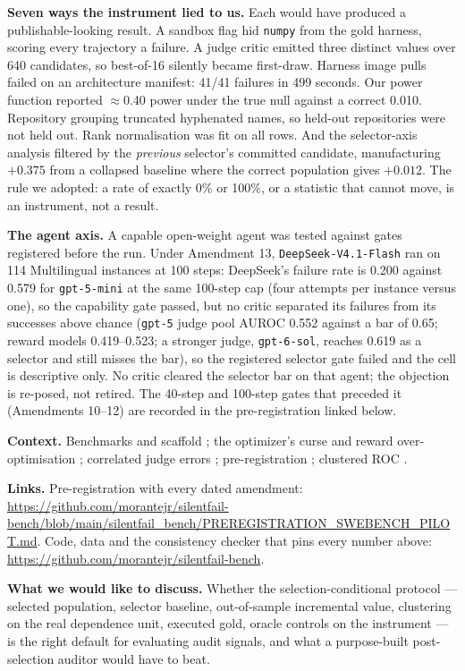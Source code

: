\documentclass[11pt,a4paper]{article}
\begin{document}
\textbf{Seven ways the instrument lied to us.} Each would have produced a publishable-looking result. A sandbox flag hid \texttt{numpy} from the gold harness, scoring every trajectory a failure. A judge critic emitted three distinct values over 640 candidates, so best-of-16 silently became first-draw. Harness image pulls failed on an architecture manifest: 41/41 failures in 499 seconds. Our power function reported $\approx$0.40 power under the true null against a correct 0.010. Repository grouping truncated hyphenated names, so held-out repositories were not held out. Rank normalisation was fit on all rows. And the selector-axis analysis filtered by the \emph{previous} selector's committed candidate, manufacturing $+0.375$ from a collapsed baseline where the correct population gives $+0.012$. The rule we adopted: a rate of exactly 0\% or 100\%, or a statistic that cannot move, is an instrument, not a result.

\textbf{The agent axis.} A capable open-weight agent was tested against gates registered before the run. Under Amendment 13, \texttt{DeepSeek-V4.1-Flash} ran on 114 Multilingual instances at 100 steps: DeepSeek's failure rate is 0.200 against 0.579 for \texttt{gpt-5-mini} at the same 100-step cap (four attempts per instance versus one), so the capability gate passed, but no critic separated its failures from its successes above chance (\texttt{gpt-5} judge pool AUROC 0.552 against a bar of 0.65; reward models 0.419--0.523; a stronger judge, \texttt{gpt-6-sol}, reaches 0.619 as a selector and still misses the bar), so the registered selector gate failed and the cell is descriptive only. No critic cleared the selector bar on that agent; the objection is re-posed, not retired. The 40-step and 100-step gates that preceded it (Amendments 10--12) are recorded in the pre-registration linked below.

\textbf{Context.} Benchmarks and scaffold \citep{jimenez2024swebench,yang2025multilingual,miniswe2025}; the optimizer's curse \citep{smith2006optimizer} and reward over-optimisation \citep{gao2023scaling}; correlated judge errors \citep{goel2025great,kohli2026nine}; pre-registration \citep{nosek2018preregistration}; clustered ROC \citep{obuchowski1997nonparametric}.

\textbf{Links.} Pre-registration with every dated amendment: \url{https://github.com/morantejr/silentfail-bench/blob/main/silentfail_bench/PREREGISTRATION_SWEBENCH_PILOT.md}. Code, data and the consistency checker that pins every number above: \url{https://github.com/morantejr/silentfail-bench}.

\textbf{What we would like to discuss.} Whether the selection-conditional protocol --- selected population, selector baseline, out-of-sample incremental value, clustering on the real dependence unit, executed gold, oracle controls on the instrument --- is the right default for evaluating audit signals, and what a purpose-built post-selection auditor would have to beat.


\end{document}
